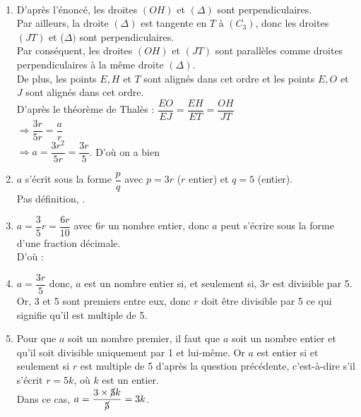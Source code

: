 \ \\ [-5mm]
\begin{enumerate}
   \item D'après l'énoncé, les droites $(OH)$ et $(\Delta)$ sont perpendiculaires. \\
   Par ailleurs, la droite $(\Delta)$ est tangente en $T$ à $(C_3)$, donc les droites $(JT)$ et ($\Delta)$ sont perpendiculaires. \\
   Par conséquent, les droites $(OH)$ et $(JT)$ sont parallèles comme droites perpendiculaires à la même droite $(\Delta)$. \\
   De plus, les points $E, H$ et $T$ sont alignés dans cet ordre et les points $E, O $ et $J$ sont alignés dans cet ordre. \\
   D'après le théorème de Thalès : $\dfrac{EO}{EJ} =\dfrac{EH}{ET} =\dfrac{OH}{JT}$ \\ [1mm]
   \hspace*{4.2cm} $\Rightarrow \dfrac{3r}{5r} =\dfrac{a}{r}$ \\ [1mm]
   \hspace*{4.3cm} $\Rightarrow a =\dfrac{3r^2}{5r} =\dfrac{3r}{5}$. \quad D'où on a bien 
   \item $a$ s'écrit sous la forme $\dfrac{p}{q}$ avec $p =3r$ ($r$ entier) et $q =5$ (entier). \\ [1mm]
   Pas définition, .
   \item $a =\dfrac35r =\dfrac{6r}{10}$ avec $6r$ un nombre entier, donc $a$ peut s'écrire sous la forme d'une fraction décimale. \\ [1mm]
   D'où : 
   \item $a =\dfrac{3r}{5}$ donc, $a$ est un nombre entier si, et seulement si, $3r$ est divisible par 5. \\ [1mm]
   Or, 3 et 5 sont premiers entre eux, donc $r$ doit être divisible par 5 ce qui signifie qu'il est multiple de 5. \\
   \item Pour que $a$ soit un nombre premier, il faut que $a$ soit un nombre entier et qu'il soit divisible uniquement par 1 et lui-même. Or $a$ est entier si et seulement si $r$ est multiple de 5 d'après la question précédente, c'est-à-dire s'il s'écrit $r = 5k$, où $k$ est un entier. \\
   Dans ce cas, $a = \dfrac{3\times\cancel{5}k}{\cancel{5}} =3k$. \\ [1mm]

\end{enumerate}
